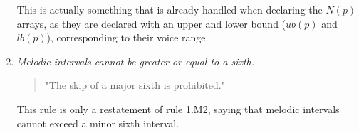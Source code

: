 \begin{enumerate}[wide, label=\bfseries 1.M\arabic*]
    This is actually something that is already handled when declaring the $N(p)$ arrays, as they are declared with an upper and lower bound ($ub(p)$ and $lb(p)$), corresponding to their voice range.

    \item\label{rule:template} \reddot \textit{Melodic intervals cannot be greater or equal to a sixth.}

    \begin{quotation}
    "The skip of a major sixth is prohibited."
    \textcite[p.79]{GaPEng}
    \end{quotation}

    This rule is only a restatement of rule 1.M2, saying that melodic intervals cannot exceed a minor sixth interval.
\end{enumerate}

